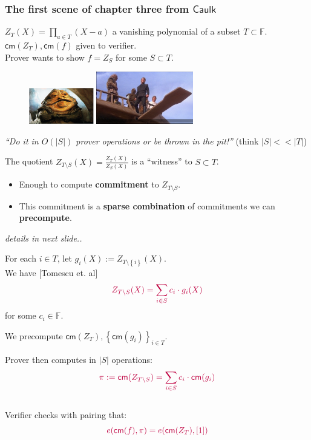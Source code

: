 \documentclass[shadesubsections,compress,14pt,mathserif]{beamer}
\newcommand{\F}{\ensuremath{{\mathbb F}}}
\newcommand{\set}[1]{\ensuremath{\left\{#1\right\}}}
\newcommand{\sett}[2]{\ensuremath{\left\{#1\right\}_{#2}}}
\newcommand{\enc}[1]{\ensuremath{\left[#1\right ]}}
\newcommand{\cm}{\ensuremath{\mathsf{cm}}}
\newcommand{\defeq}{\ensuremath{:=}}
\newcommand{\nl}{\\ \pause \vspace{0.2in}}
\newcommand{\nlnp}{\\ \vspace{0.2in}}
\begin{document}
\begin{frame}
 \frametitle{ The first scene of chapter three from $\mathsf{Caulk}$}\pause
 $Z_T(X)=\prod_{a\in T} (X-a)$ 
 a vanishing polynomial of a subset $T\subset \F$.\nl
 $\cm(Z_T),\cm(f)$ given to verifier.\pause \\
 Prover wants to show $f=Z_S$ for some $S\subset T$.\pause
 \begin{figure}
  \includegraphics[width=80pt]{jabba.png}
  \includegraphics[width=120pt]{luke.png}
\end{figure}
 
 \textit{``Do it in  $O(|S|)$ prover operations or  be thrown in the pit!''} (think $|S|<<|T|$)
\end{frame}
\begin{frame}
 The quotient $Z_{T\setminus S}(X) =\frac{Z_T(X)}{Z_S(X)}$ is a ``witness'' to $S\subset T$. \nl
\begin{itemize}
 \item Enough to compute \textbf{commitment} to $Z_{T\setminus S}$. \pause
 \item This commitment is a \textbf{sparse combination} of commitments we can \textbf{precompute}.
\end{itemize}
\emph{details in next slide..}
\end{frame}

\begin{frame}
 For each $i\in T$, let $g_i(X)\defeq Z_{T\setminus\set{i}}(X)$.\nl
 We have {\small[Tomescu et. al]}
 \[\color{purple}Z_{T\setminus S} (X) = \sum_{i\in S} c_i\cdot g_i(X)\]
 for some $c_i\in \F$.\nl
 

 We precompute $\cm(Z_T),\sett{\cm(g_i)}{i\in T}$.\nlnp
\end{frame} 
 \begin{frame}
 Prover then computes in $|S|$ operations:
 \[\color{purple}\pi:=\cm(Z_{T\setminus S}) = \sum_{i\in S} c_i\cdot \cm(g_i)\]\nl
Verifier checks with pairing that:
\[\color{purple}e(\cm(f),\pi) =e(\cm(Z_T),\enc{1})\]
\end{frame}
\end{document}
